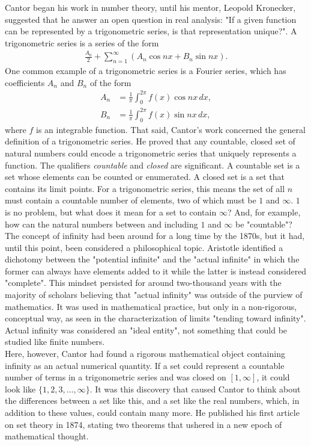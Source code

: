 Cantor began his work in number theory, until his mentor, Leopold Kronecker, suggested that he answer an open question in real analysis: "If a given function can be represented by a trigonometric series, is that representation unique?". A trigonometric series is a series of the form
\begin{align*}
\frac{A_0}{2}+\sum_{n=1}^{\infty}(A_n\cos nx + B_n\sin nx).
\end{align*}
One common example of a trigonometric series is a Fourier series, which has coefficients $A_n$ and $B_n$ of the form
\begin{align*}
A_n&=\frac{1}{\pi}\int_{0}^{2\pi}f(x)\cos nx\,dx, \\[1mm]
B_n&=\frac{1}{\pi}\int_{0}^{2\pi}f(x)\sin nx\,dx,
\end{align*}
where $f$ is an integrable function. That said, Cantor's work concerned the general definition of a trigonometric series. He proved that any countable, closed set of natural numbers could encode a trigonometric series that uniquely represents a function. The qualifiers \textit{countable} and \textit{closed} are significant. A countable set is a set whose elements can be counted or enumerated. A closed set is a set that contains its limit points. For a trigonometric series, this means the set of all $n$ must contain a countable number of elements, two of which must be $1$ and $\infty$. $1$ is no problem, but what does it mean for a set to contain $\infty$? And, for example, how can the natural numbers between and including $1$ and $\infty$ be "countable"? \\

The concept of infinity had been around for a long time by the 1870s, but it had, until this point, been considered a philosophical topic. Aristotle identified a dichotomy between the "potential infinite" and the "actual infinite" in which the former can always have elements added to it while the latter is instead considered "complete". This mindset persisted for around two-thousand years with the majority of scholars believing that "actual infinity" was outside of the purview of mathematics. It was used in mathematical practice, but only in a non-rigorous, conceptual way, as seen in the characterization of limits "tending toward infinity". Actual infinity was considered an "ideal entity", not something that could be studied like finite numbers. \\

Here, however, Cantor had found a rigorous mathematical object containing infinity as an actual numerical quantity. If a set could represent a countable number of terms in a trigonometric series and was closed on $[1,\infty]$, it could look like $\{1,2,3,\dots,\infty\}$. It was this discovery that caused Cantor to think about the differences between a set like this, and a set like the real numbers, which, in addition to these values, could contain many more. He published his first article on set theory in 1874, stating two theorems that ushered in a new epoch of mathematical thought. \\


